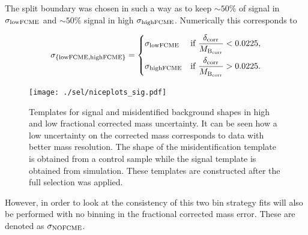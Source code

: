 The split boundary was chosen in such a way as to keep $\sim50\%$ of signal in $\sigma_{\rm{lowFCME}}$ and $\sim50\%$ signal in high $\sigma_{\rm{highFCME}}$.
Numerically this corresponds to 

\begin{equation}
\sigma_{\rm{\{lowFCME,highFCME\}}}=
   \begin{dcases}
	   \sigma_{\rm{lowFCME}} &\text{if  }  \frac{\delta_\mathrm{{corr}}}{M_{\mathrm{B_{corr}}}} < 0.0225,\\
	  \sigma_{\rm{highFCME}} &\text{if  }  \frac{\delta_\mathrm{{corr}}}{M_{\mathrm{B_{corr}}}} > 0.0225. 
   \end{dcases}
\label{eq:impsplit}
\end{equation}

\begin{figure}[H]
\centering
        \texttt{[image: ./sel/niceplots\_sig.pdf]}
        \caption{Templates for signal and misidentified background
          shapes in high and low fractional corrected mass
          uncertainty. It can be seen how a low uncertainty on the
          corrected mass corresponds to data with better mass
          resolution. The shape of the misidentification template is
          obtained from a control sample while the signal template is
          obtained from simulation. These templates are constructed after the full selection was applied.}
\label{fig:resofit}
\end{figure}


However, in order to look at the consistency of this two bin strategy fits will also be performed with no binning in the fractional corrected mass error. These are denoted as $\sigma_{\rm{NOFCME}}$.
